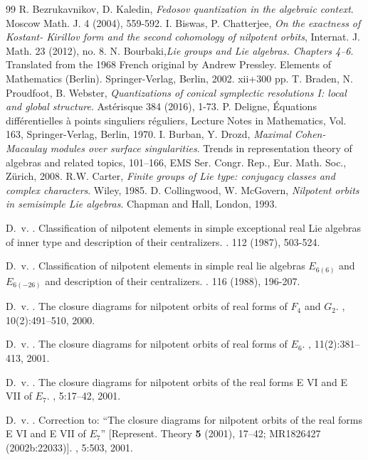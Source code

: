 \documentclass[12pt]{amsart}
\theoremstyle{definition}
\numberwithin{equation}{section}
\begin{document}
\begin{thebibliography}{99}
 R. Bezrukavnikov, D. Kaledin, {\it Fedosov quantization in the algebraic context}.
Moscow Math. J. 4 (2004), 559-592.
 I. Biswas, P. Chatterjee, {\it On the exactness of Kostant- Kirillov form and the second cohomology of nilpotent orbits}, Internat. J. Math. 23 (2012), no. 8.
 N. Bourbaki,{\it Lie groups and Lie algebras. Chapters 4–6}.
Translated from the 1968 French original by Andrew Pressley. Elements of Mathematics (Berlin). Springer-Verlag, Berlin, 2002. xii+300 pp.
 T. Braden, N. Proudfoot, B. Webster, {\it Quantizations of conical symplectic resolutions I: local and global structure}. Ast\'{e}risque 384 (2016), 1-73.
 P. Deligne, Équations différentielles à points singuliers réguliers, Lecture Notes in Mathematics, Vol. 163, Springer-Verlag, Berlin, 1970.
 I. Burban, Y. Drozd, {\it Maximal Cohen-Macaulay modules over surface singularities}. Trends in representation theory of algebras and related topics, 101–166, EMS Ser. Congr. Rep., Eur. Math. Soc., Zürich, 2008.
 R.W. Carter, {\it Finite groups of Lie type: conjugacy classes and complex characters}. Wiley, 1985.
 D. Collingwood, W. McGovern, {\it Nilpotent orbits in semisimple Lie algebras}.
Chapman and Hall, London, 1993.

D.~v. . 
\newblock Classification of nilpotent elements in simple exceptional real Lie algebras of inner type and description of their centralizers.
. 112 (1987), 503-524.

 D.~v. . 
\newblock Classification of nilpotent elements in simple real lie algebras $E_{6(6)}$ and $E_{6(-26)}$ and description of their centralizers.
. 116 (1988), 196-207.

D.~v. .
\newblock The closure diagrams for nilpotent orbits of real forms of {$F_4$}
and {$G_2$}.
, 10(2):491--510, 2000.

D.~v. .
\newblock The closure diagrams for nilpotent orbits of real forms of {$E_6$}.
, 11(2):381--413, 2001.


D.~v. .
\newblock The closure diagrams for nilpotent orbits of the real forms {E} {VI}
and {E} {VII} of {$E_7$}.
, 5:17--42, 2001.

D.~v. .
\newblock Correction to: ``{T}he closure diagrams for nilpotent orbits of the
real forms {E} {VI} and {E} {VII} of {$E_7$}'' [{R}epresent. {T}heory {\bf 5}
(2001), 17--42; {MR}1826427 (2002b:22033)].
, 5:503, 2001.


\end{thebibliography}
\end{document}

